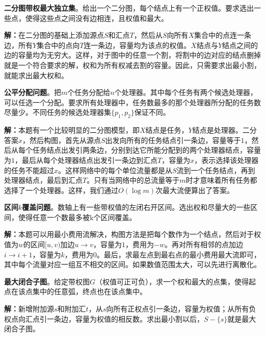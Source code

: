 \documentclass[twoside]{article}
\begin{document}
\textbf{二分图带权最大独立集}。给出一个二分图，每个结点上有一个正权值。要求选出一些点，使得这些点之间没有边相连，且权值和最大。

\indent

\textbf{解：}在二分图的基础上添加源点$S$和汇点$T$，然后从$S$向所有$X$集合中的点连一条边，所有$Y$集合中的点向$T$连一条边，容量均为该点的权值。$X$结点与$Y$结点之间的边的容量均为无穷大。这样，对于图中的任意一个割，将割中的边对应的结点删掉就是一个符合要求的解，权和为所有权减去割的容量。因此，只需要求出最小割，就能求出最大权和。

\indent

\textbf{公平分配问题}。把$m$个任务分配给$n$个处理器。其中每个任务有两个候选处理器，可以任选一个分配。要求所有处理器中，任务数最多的那个处理器所分配的任务数尽量少。不同任务的候选处理器集$\lbrace p_1 , p_2 \rbrace$保证不同。

\indent

\textbf{解：}本题有一个比较明显的二分图模型，即$X$结点是任务，$Y$结点是处理器。二分答案$x$，然后构图，首先从源点$S$出发向所有的任务结点引一条边，容量等于$1$，然后从每个任务结点出发引两条边，分别到达它所能分配到的两个处理器结点，容量为$1$，最后从每个处理器结点出发引一条边到汇点$T$，容量为$x$，表示选择该处理器的任务不能超过$x$。这样网络中的每个单位流量都是从$S$流到一个任务结点，再到处理器结点，最后到汇点$T$。只有当网络中的总流量等于$m$时才意味着所有任务都选择了一个处理器。这样，我们通过$O(\log m)$次最大流便算出了答案。

\indent

\textbf{区间$k$覆盖问题}。数轴上有一些带权值的左闭右开区间。选出权和尽量大的一些区间，使得任意一个数最多被k个区间覆盖。

\indent

\textbf{解：}本题可以用最小费用流解决，构图方法是把每个数作为一个结点，然后对于权值为$w$的区间$[u,v)$加边$u→v$，容量为$1$，费用为$-w$。再对所有相邻的点加边$i→i+1$，容量为$k$，费用为$0$。最后，求最左点到最右点的最小费用最大流即可，其中每个流量对应一组互不相交的区间。如果数值范围太大，可以先进行离散化。

\indent

\textbf{最大闭合子图}。给定带权图$G$（权值可正可负），求一个权和最大的点集，使得起点在该点集中的任意弧，终点也在该点集中。

\indent

\textbf{解：}新增附加源$s$和附加汇$t$，从$s$向所有正权点引一条边，容量为权值；从所有负权点向汇点引一条边，容量为权值的相反数。求出最小割以后，$S - \lbrace s \rbrace$就是最大闭合子图。
\end{document}
